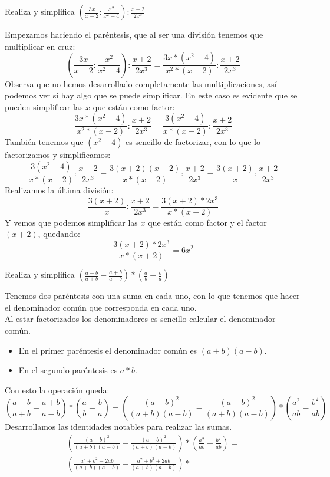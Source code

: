 \documentclass[a4paper,11pt,answers]{exam}
\begin{document}
\begin{questions}
\question Realiza y simplifica $\left(\frac{3x}{x-2}:\frac{x^2}{x^2 - 4}\right):\frac{x+2}{2x^3}$
  \begin{solution}
    Empezamos haciendo el paréntesis, que al ser una división tenemos que multiplicar en cruz:
    \[\left(\frac{3x}{x-2}:\frac{x^2}{x^2 - 4}\right):\frac{x+2}{2x^3} =
      \frac{3x*(x^2 - 4)}{x^2*(x-2)}:\frac{x+2}{2x^3}\]
    Observa que no hemos desarrollado completamente las multiplicaciones, así podemos ver si hay algo que se puede simplificar. En este caso es evidente que se pueden simplificar las $x$ que están como factor:
    \[\frac{3x*(x^2 - 4)}{x^2*(x-2)}:\frac{x+2}{2x^3} = \frac{3(x^2 - 4)}{x*(x-2)}:\frac{x+2}{2x^3}\]
    También tenemos que $(x^2 - 4)$ es sencillo de factorizar, con lo que lo factorizamos y simplificamos:
    \[\frac{3(x^2 - 4)}{x*(x-2)}:\frac{x+2}{2x^3} =
      \frac{3(x+2)(x-2)}{x*(x-2)}:\frac{x+2}{2x^3} = \frac{3(x+2)}{x}:\frac{x+2}{2x^3}\]
    Realizamos la última división:
    \[\frac{3(x+2)}{x}:\frac{x+2}{2x^3} = \frac{3(x+2)*2x^3}{x*(x+2)}\]
    Y vemos que podemos simplificar las $x$ que están como factor y el factor $(x+2)$, quedando:
    \[\frac{3(x+2)*2x^3}{x*(x+2)} = 6x^2\]
  \end{solution}
\question Realiza y simplifica $\left(\frac{a-b}{a+b}-\frac{a+b}{a-b}\right)*
  \left(\frac{a}{b} - \frac{b}{a}\right)$
  \begin{solution}
    Tenemos dos paréntesis con una suma en cada uno, con lo que tenemos que hacer el denominador común que corresponda en cada uno.\\
    Al estar factorizados los denominadores es sencillo calcular el denominador común.
    \begin{itemize}
    \item En el primer paréntesis el denominador común es $(a+b)(a-b)$.
    \item En el segundo paréntesis es $a*b$.
    \end{itemize}
    Con esto la operación queda:
    \[\left(\frac{a-b}{a+b}-\frac{a+b}{a-b}\right)*
      \left(\frac{a}{b} - \frac{b}{a}\right) =
      \left(\frac{(a-b)^2}{(a+b)(a-b)}-\frac{(a+b)^2}{(a+b)(a-b)}\right)*
      \left(\frac{a^2}{ab} - \frac{b^2}{ab}\right)\]
    Desarrollamos las identidades notables para realizar las sumas.
    \begin{gather*}
      \left(\frac{(a-b)^2}{(a+b)(a-b)}-\frac{(a+b)^2}{(a+b)(a-b)}\right)*
      \left(\frac{a^2}{ab} - \frac{b^2}{ab}\right) =\\
      \left(\frac{a^2 + b^2 - 2ab}{(a+b)(a-b)}-\frac{a^2+b^2 + 2ab}{(a+b)(a-b)}\right)*

\end{gather*}
\end{solution}
\end{questions}
\end{document}
